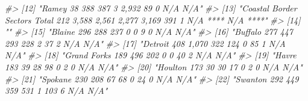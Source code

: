 \documentclass[
]{krantz}
\makeatletter
\newenvironment{Shaded}{\begin{snugshade}}{\end{snugshade}}
\newcommand{\CommentTok}[1]{\textcolor[rgb]{0.37,0.37,0.37}{\textit{#1}}}
\newenvironment{kframe}{%
\medskip{}
\setlength{\fboxsep}{.8em}
 \def\at@end@of@kframe{}%
 \ifinner\ifhmode%
  \def\at@end@of@kframe{\end{minipage}}%
  \begin{minipage}{\columnwidth}%
 \fi\fi%
 \def\FrameCommand##1{\hskip\@totalleftmargin \hskip-\fboxsep
 \colorbox{shadecolor}{##1}\hskip-\fboxsep
     \hskip-\linewidth \hskip-\@totalleftmargin \hskip\columnwidth}%
 \MakeFramed {\advance\hsize-\width
   \@totalleftmargin\z@ \linewidth\hsize
   \@setminipage}}%
 {\par\unskip\endMakeFramed%
 \at@end@of@kframe}
\renewenvironment{Shaded}{\begin{kframe}}{\end{kframe}}
\makeatother
\begin{document}
\begin{Shaded}
\begin{Highlighting}[]
\CommentTok{\#\textgreater{} [12] "Ramey                                              38               388                       387                     3               2,932              89               0           N/A         N/A"     }
\CommentTok{\#\textgreater{} [13] "Coastal Border Sectors Total                      212              3,588                     2,561                  2,277             3,169              391              1         N/A ****    N/A ****"  }
\CommentTok{\#\textgreater{} [14] ""                                                                                                                                                                                                          }
\CommentTok{\#\textgreater{} [15] "Blaine                                            296                288                      237                      0                 0                9               0              N/A      N/A"     }
\CommentTok{\#\textgreater{} [16] "Buffalo                                           277                447                      293                    228                 2               37               2              N/A      N/A"     }
\CommentTok{\#\textgreater{} [17] "Detroit                                           408              1,070                      322                    124                 0               85               1              N/A      N/A"     }
\CommentTok{\#\textgreater{} [18] "Grand Forks                                       189                496                      202                      0                 0               40               2              N/A      N/A"     }
\CommentTok{\#\textgreater{} [19] "Havre                                             183                39                        28                     98                 0                2               0              N/A      N/A"     }
\CommentTok{\#\textgreater{} [20] "Houlton                                           173                30                        30                     17                 0                2               0              N/A      N/A"     }
\CommentTok{\#\textgreater{} [21] "Spokane                                           230                208                       67                     68                 0               24               0              N/A      N/A"     }
\CommentTok{\#\textgreater{} [22] "Swanton                                           292               449                       359                    531                 1               103               6             N/A      N/A"     }

\end{Highlighting}
\end{Shaded}
\end{document}

